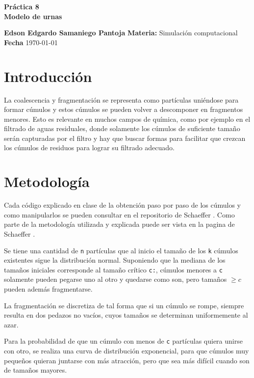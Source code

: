 \documentclass[a4paper, 11pt]{article}
\begin{document}
\begin{center}
\LARGE \bf Pr\'actica 8\\ Modelo de urnas 
\end{center}

\vspace{1cm} 
\noindent\textbf {Edson Edgardo Samaniego Pantoja} \hfill \textbf{Materia:} Simulación computacional 
\hfill \\
\textbf{Fecha} \today  
\vspace{1cm} 

\section{Introducción}
La coalescencia y fragmentación se representa como partículas uniéndose para formar cúmulos y estos cúmulos se pueden volver a descomponer en fragmentos menores. Esto es relevante en muchos campos de química, como por ejemplo en el filtrado de aguas residuales, donde solamente los cúmulos de suficiente tamaño serán capturadas por el filtro y hay que buscar formas para facilitar que crezcan los cúmulos de residuos para lograr su filtrado adecuado.

\section{Metodología}
Cada código explicado en clase de la obtención paso por paso de los cúmulos y como manipularlos se pueden consultar en el repositorio de Schaeffer \cite{dra}. Como parte de la metodología utilizada y explicada puede ser vista en la pagina de Schaeffer \cite{elisa}.

Se tiene una cantidad de \texttt{n} partículas que al inicio el tamaño de los \texttt{k} cúmulos existentes sigue la distribución normal. Suponiendo que la mediana de los tamaños iniciales corresponde al tamaño crítico \texttt{c:}, cúmulos menores a \texttt{c} solamente pueden pegarse uno al otro y quedarse como son, pero tamaños \texttt{$\geq c$} pueden además fragmentarse.

La fragmentación se discretiza de tal forma que si un cúmulo se rompe, siempre resulta en dos pedazos no vacíos, cuyos tamaños se determinan uniformemente al azar.

Para la probabilidad de que un cúmulo con menos de \texttt{c} partículas quiera unirse con otro, se realiza una curva de distribución exponencial, para que cúmulos muy pequeños quieran juntarse con más atracción, pero que sea más difícil cuando son de tamaños mayores. 
\end{document}
